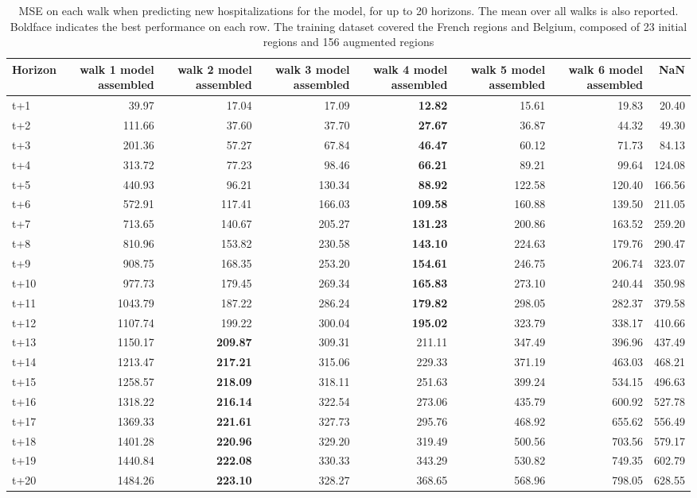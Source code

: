\begin{table}[H]
\centering
\caption{MSE on each walk when predicting new hospitalizations for the model, for up to 20 horizons. The mean over all walks is also reported. Boldface indicates the best performance on each row. The training dataset covered the French regions and Belgium, composed of 23 initial regions and 156 augmented regions }
\label{tab:MSE_walk_assembly}
\begin{tabular}{lrrrrrrr}
\toprule
Horizon &  walk 1 model assembled &  walk 2 model assembled &  walk 3 model assembled &  walk 4 model assembled &  walk 5 model assembled &  walk 6 model assembled &    NaN \\
\midrule
t+1  & 39.97  & 17.04  & 17.09  & \textbf{12.82}  & 15.61  & 19.83  & 20.40  \\
t+2  & 111.66  & 37.60  & 37.70  & \textbf{27.67}  & 36.87  & 44.32  & 49.30  \\
t+3  & 201.36  & 57.27  & 67.84  & \textbf{46.47}  & 60.12  & 71.73  & 84.13  \\
t+4  & 313.72  & 77.23  & 98.46  & \textbf{66.21}  & 89.21  & 99.64  & 124.08  \\
t+5  & 440.93  & 96.21  & 130.34  & \textbf{88.92}  & 122.58  & 120.40  & 166.56  \\
t+6  & 572.91  & 117.41  & 166.03  & \textbf{109.58}  & 160.88  & 139.50  & 211.05  \\
t+7  & 713.65  & 140.67  & 205.27  & \textbf{131.23}  & 200.86  & 163.52  & 259.20  \\
t+8  & 810.96  & 153.82  & 230.58  & \textbf{143.10}  & 224.63  & 179.76  & 290.47  \\
t+9  & 908.75  & 168.35  & 253.20  & \textbf{154.61}  & 246.75  & 206.74  & 323.07  \\
t+10  & 977.73  & 179.45  & 269.34  & \textbf{165.83}  & 273.10  & 240.44  & 350.98  \\
t+11  & 1043.79  & 187.22  & 286.24  & \textbf{179.82}  & 298.05  & 282.37  & 379.58  \\
t+12  & 1107.74  & 199.22  & 300.04  & \textbf{195.02}  & 323.79  & 338.17  & 410.66  \\
t+13  & 1150.17  & \textbf{209.87}  & 309.31  & 211.11  & 347.49  & 396.96  & 437.49  \\
t+14  & 1213.47  & \textbf{217.21}  & 315.06  & 229.33  & 371.19  & 463.03  & 468.21  \\
t+15  & 1258.57  & \textbf{218.09}  & 318.11  & 251.63  & 399.24  & 534.15  & 496.63  \\
t+16  & 1318.22  & \textbf{216.14}  & 322.54  & 273.06  & 435.79  & 600.92  & 527.78  \\
t+17  & 1369.33  & \textbf{221.61}  & 327.73  & 295.76  & 468.92  & 655.62  & 556.49  \\
t+18  & 1401.28  & \textbf{220.96}  & 329.20  & 319.49  & 500.56  & 703.56  & 579.17  \\
t+19  & 1440.84  & \textbf{222.08}  & 330.33  & 343.29  & 530.82  & 749.35  & 602.79  \\
t+20  & 1484.26  & \textbf{223.10}  & 328.27  & 368.65  & 568.96  & 798.05  & 628.55  \\

\bottomrule
\end{tabular}
\end{table}
